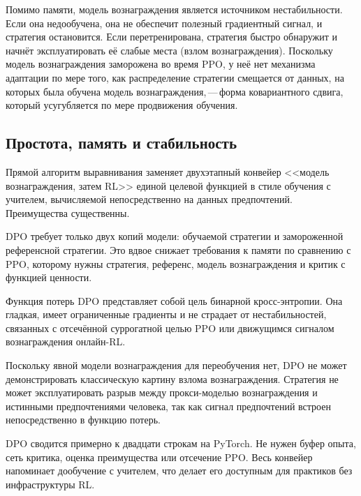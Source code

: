 Помимо памяти, модель вознаграждения является источником нестабильности. Если она недообучена, она не обеспечит полезный градиентный сигнал, и стратегия остановится. Если перетренирована, стратегия быстро обнаружит и начнёт эксплуатировать её слабые места (взлом вознаграждения). Поскольку модель вознаграждения заморожена во время PPO, у неё нет механизма адаптации по мере того, как распределение стратегии смещается от данных, на которых была обучена модель вознаграждения,\,---\,форма ковариантного сдвига, который усугубляется по мере продвижения обучения.

\subsection{Простота, память и стабильность}

Прямой алгоритм выравнивания заменяет двухэтапный конвейер <<модель вознаграждения, затем RL>> единой целевой функцией в стиле обучения с учителем, вычисляемой непосредственно на данных предпочтений. Преимущества существенны.

\begin{description}[leftmargin=!,labelwidth=3.5cm,align=parleft]
  \item[Занимаемая память] DPO требует только двух копий модели: обучаемой стратегии и замороженной референсной стратегии. Это вдвое снижает требования к памяти по сравнению с PPO, которому нужны стратегия, референс, модель вознаграждения и критик с функцией ценности.
  \item[Стабильность обучения] Функция потерь DPO представляет собой цель бинарной кросс-энтропии. Она гладкая, имеет ограниченные градиенты и не страдает от нестабильностей, связанных с отсечённой суррогатной целью PPO или движущимся сигналом вознаграждения онлайн-RL.
  \item[Отсутствие взлома вознаграждения] Поскольку явной модели вознаграждения для переобучения нет, DPO не может демонстрировать классическую картину взлома вознаграждения. Стратегия не может эксплуатировать разрыв между прокси-моделью вознаграждения и истинными предпочтениями человека, так как сигнал предпочтений встроен непосредственно в функцию потерь.
  \item[Простота реализации] DPO сводится примерно к двадцати строкам на PyTorch. Не нужен буфер опыта, сеть критика, оценка преимущества или отсечение PPO. Весь конвейер напоминает дообучение с учителем, что делает его доступным для практиков без инфраструктуры RL.
\end{description}

